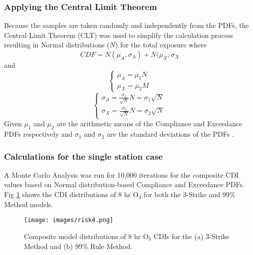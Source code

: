 \subsubsection{Applying the Central Limit Theorem}

Because the samples are taken randomly and independently from the PDFs, the Central Limit Theorem (CLT) was used to simplify the calculation process resulting in Normal distributions ($N$) for the total exposure where
%
\begin{equation}
\label{eq4:cdfN}
CDF=N(\mu_{A},\sigma_{A})+N(\mu_{X},\sigma_{X}
\end{equation}
%
\noindent
and
%
\begin{equation}
\label{eq5:cdfmu}
\left\{\begin{matrix}
\mu_{A} = \mu_{1}N
\\ 
\mu_{X} = \mu_{2}M
\end{matrix}\right.
\end{equation}
%
\begin{equation}
\label{eq6:cdfsigma}
\left\{\begin{matrix}
\sigma_{A} = \frac{\sigma_{1}}{\sqrt{N}}N = \sigma_{1}\sqrt{N}
\\ 
\sigma_{X} = \frac{\sigma_{2}}{\sqrt{N}}N = \sigma_{2}\sqrt{N}
\end{matrix}\right.
\end{equation}
%
Given $\mu_{1}$ and $\mu_{2}$ are the arithmetic means of the Compliance and Exceedance PDFs respectively and $\sigma_{1}$ and $\sigma_{2}$ are the standard deviations of the PDFs \citep{Ott1981}. 

\subsubsection{Calculations for the single station case}

A Monte Carlo Analysis was run for 10,000 iterations for the composite CDI values based on Normal distribution-based Compliance and Exceedance PDFs.  Fig \ref{fig4:composite} shows the CDI distributions of 8 hr O$_{3}$ for both the 3-Strike and 99\% Method models. 
%  
\begin{figure}[H]
\texttt{[image: images/risk4.png]} 
\caption[Composite model distributions of 8 hr O$_{3}$ CDIs]{Composite model distributions of 8 hr O$_{3}$ CDIs for the (a) 3-Strike Method and (b) 99\% Rule Method.}
\label{fig4:composite}
\end{figure}
%

